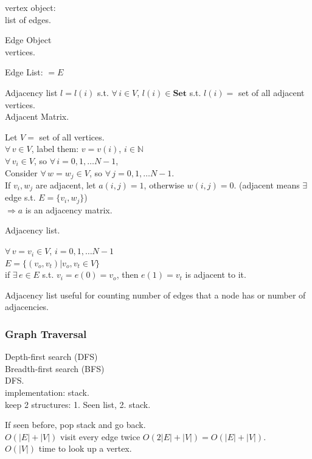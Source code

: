 \documentclass[10pt]{amsart}
\begin{document}
\begin{multicols*}{2}
vertex object: \\
list of edges. 

Edge Object \\
vertices. 

Edge List: $=E$ 

Adjacency list $l = l(i)$ s.t. $\forall \, i \in V$, $l(i) \in \textbf{Set}$ s.t. $l(i) = $ set of all adjacent vertices. \\

Adjacent Matrix. 

Let $V=$ set of all vertices. \\
$\forall \, v \in V$, label them: $v=v(i)$, $i \in \mathbb{N}$ \\

$\forall \, v_i \in V$, so $\forall \, i = 0, 1, \dots N-1$, \\
Consider $\forall \, w = w_j \in V$, so $\forall \, j = 0 , 1, \dots N-1$. \\

If $v_i, w_j$ are adjacent, let $a(i,j) = 1$, otherwise $w(i,j) =0$. (adjacent means $\exists \,$ edge s.t. $E = \lbrace v_i, w_j \rbrace$) \\
$\Longrightarrow a$ is an adjacency matrix. 

Adjacency list. 

$\forall \, v = v_i \in V$, $i=0,1,\dots N-1$ \\
$E = \lbrace (v_o, v_t) | v_o, v_t \in V \rbrace$ \\
if $\exists \, e \in E$ s.t. $v_i = e(0) = v_o$, then $e(1) = v_t$ is adjacent to it. 

Adjacency list useful for counting number of edges that a node has or number of adjacencies.

\subsubsection{Graph Traversal}  

Depth-first search (DFS) \\
Breadth-first search (BFS) \\

DFS. \\
implementation: stack. \\
keep 2 structures: 1. Seen list, 2. stack. 

If seen before, pop stack and go back. \\
$O(|E| + |V|)$ visit every edge twice $O(2|E| + |V|) = O(|E| + |V|)$. \\
$O(|V|)$ time to look up a vertex. 


\end{multicols*}
\end{document}
